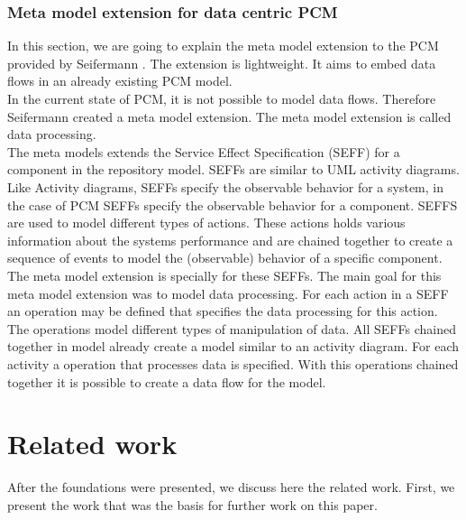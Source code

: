 \subsection{Meta model extension for data centric PCM}
\label{MMext}
In this section, we are going to explain the meta model extension to the PCM provided by Seifermann \cite{MMextension}. The extension is lightweight. It aims to embed data flows in an already existing PCM model.\\ 
In the current state of PCM, it is not possible to model data flows. Therefore Seifermann created a meta model extension. The meta model extension is called data processing. \\
The meta models extends the Service Effect Specification (SEFF) for a component in the repository model. SEFFs are similar to UML activity diagrams. Like Activity diagrams, SEFFs specify the observable behavior for a system, in the case of PCM SEFFs specify the observable behavior for a component. SEFFS are used to model different types of actions. These actions holds various information about the systems performance and are chained together to create a sequence of events to model the (observable) behavior of a specific component.\\ The meta model extension is specially for these SEFFs. The main goal for this meta model extension was to model data processing.  For each action in a SEFF an operation may be defined that specifies the data processing for this action. The operations model different types of manipulation of data. All SEFFs chained together in model already create a model similar to an activity diagram. For each activity a operation that processes data is specified. With this operations chained together it is possible to create a data flow for the model. 


\chapter{Related work}
After the foundations were presented, we discuss here the related work.  First, we present the work that was the basis for further work on this paper.

